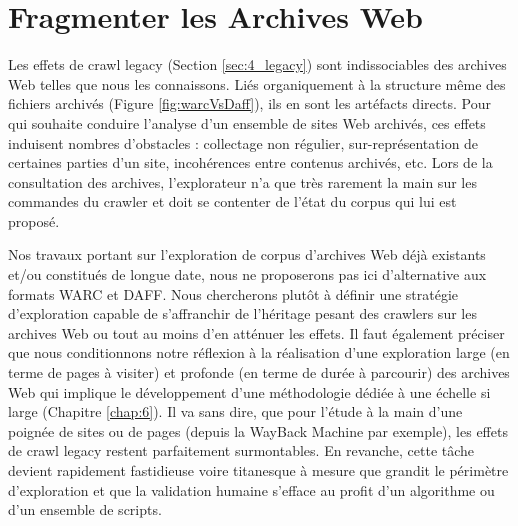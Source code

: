 \documentclass[symmetric,justified,marginals=raggedouter]{tufte-book}
\begin{document}

\chapter{Fragmenter les Archives Web}
\label{chap:5}

\par\noindent Les effets de crawl legacy (Section \ref{sec:4_legacy}) sont indissociables des archives Web telles que nous les connaissons. Liés organiquement à la structure même des fichiers archivés (Figure \ref{fig:warcVsDaff}), ils en sont les artéfacts directs. Pour qui souhaite conduire l'analyse d'un ensemble de sites Web archivés, ces effets induisent nombres d'obstacles : collectage non régulier, sur-représentation de certaines parties d'un site, incohérences entre contenus archivés, etc. Lors de la consultation des archives, l'explorateur n'a que très rarement la main sur les commandes du crawler et doit se contenter de l'état du corpus qui lui est proposé.

Nos travaux portant sur l'exploration de corpus d'archives Web déjà existants et/ou constitués de longue date, nous ne proposerons pas ici d'alternative aux formats WARC et DAFF. Nous chercherons plutôt à définir une stratégie d'exploration capable de s'affranchir de l'héritage pesant des crawlers sur les archives Web ou tout au moins d'en atténuer les effets. Il faut également préciser que nous conditionnons notre réflexion à la réalisation d'une exploration large (en terme de pages à visiter) et profonde (en terme de durée à parcourir) des archives Web qui implique le développement d'une méthodologie dédiée à une échelle si large (Chapitre \ref{chap:6}). Il va sans dire, que pour l'étude à la main d'une poignée de sites ou de pages (depuis la WayBack Machine par exemple), les effets de crawl legacy restent parfaitement surmontables. En revanche, cette tâche devient rapidement fastidieuse voire titanesque à mesure que grandit le périmètre d'exploration et que la validation humaine s'efface au profit d'un algorithme ou d'un ensemble de scripts.  
\end{document}
